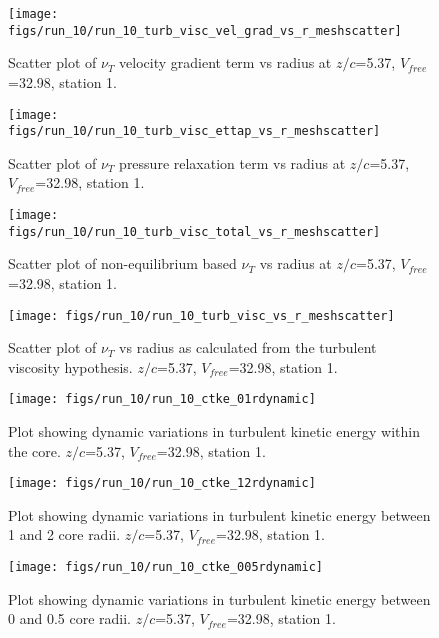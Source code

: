 \begin{figure}[H]
\centering
\texttt{[image: figs/run\_10/run\_10\_turb\_visc\_vel\_grad\_vs\_r\_meshscatter]}
\caption{Scatter plot of $\nu_T$ velocity gradient term vs radius at $z/c$=5.37, $V_{free}$=32.98, station 1.}
\end{figure}


\begin{figure}[H]
\centering
\texttt{[image: figs/run\_10/run\_10\_turb\_visc\_ettap\_vs\_r\_meshscatter]}
\caption{Scatter plot of $\nu_T$ pressure relaxation term vs radius at $z/c$=5.37, $V_{free}$=32.98, station 1.}
\end{figure}


\begin{figure}[H]
\centering
\texttt{[image: figs/run\_10/run\_10\_turb\_visc\_total\_vs\_r\_meshscatter]}
\caption{Scatter plot of non-equilibrium based $\nu_T$ vs radius at $z/c$=5.37, $V_{free}$=32.98, station 1.}
\end{figure}


\begin{figure}[H]
\centering
\texttt{[image: figs/run\_10/run\_10\_turb\_visc\_vs\_r\_meshscatter]}
\caption{Scatter plot of $\nu_T$ vs radius as calculated from the turbulent viscosity hypothesis. $z/c$=5.37, $V_{free}$=32.98, station 1.}
\end{figure}


\begin{figure}[H]
\centering
\texttt{[image: figs/run\_10/run\_10\_ctke\_01rdynamic]}
\caption{Plot showing dynamic variations in turbulent kinetic energy within the core. $z/c$=5.37, $V_{free}$=32.98, station 1.}
\end{figure}


\begin{figure}[H]
\centering
\texttt{[image: figs/run\_10/run\_10\_ctke\_12rdynamic]}
\caption{Plot showing dynamic variations in turbulent kinetic energy between 1 and 2 core radii. $z/c$=5.37, $V_{free}$=32.98, station 1.}
\end{figure}


\begin{figure}[H]
\centering
\texttt{[image: figs/run\_10/run\_10\_ctke\_005rdynamic]}
\caption{Plot showing dynamic variations in turbulent kinetic energy between 0 and 0.5 core radii. $z/c$=5.37, $V_{free}$=32.98, station 1.}
\end{figure}


